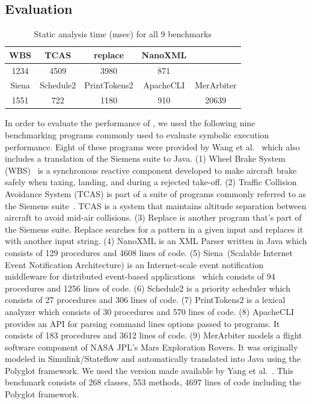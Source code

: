 \subsection{Evaluation}
\begin{table}[]
    \begin{tabular}{@{}ccccc@{}}
        \toprule
        WBS   & TCAS      & replace      & NanoXML   &            \\ \midrule
        1234  & 4509      & 3980         & 871       &            \\ \midrule
        Siena & Schedule2 & PrintTokens2 & ApacheCLI & MerArbiter \\ \midrule
        1551  & 722       & 1180         & 910       & 20639      \\ \bottomrule
    \end{tabular}
    \caption{Static analysis time (msec) for all 9 benchmarks}
    \label{table:static-analysis-time}
\end{table}
%
In order to evaluate the performance of \tool, we used the following nine benchmarking programs commonly used to
evaluate symbolic execution performance.
%
Eight of these programs were provided by Wang et al.~\cite{dgse} which also includes a translation of the
Siemens suite to Java.
%
(1) Wheel Brake System (WBS)~\cite{yang2014directed} is a synchronous reactive
component developed to make aircraft brake safely when taxing, landing, and during a rejected take-off.
%
(2) Traffic Collision Avoidance System (TCAS) is part of a suite of programs commonly referred to as the Siemens
suite~\cite{siemens-benchmarks}. TCAS is a system that maintains altitude separation between aircraft to avoid mid-air
collisions.
%
(3) Replace is another program that\rq s part of the Siemens suite. Replace searches for a pattern in a given input and
replaces it with another input string.
%
(4) NanoXML is an XML Parser written in Java which consists of 129 procedures and 4608 lines of code.
%
(5) Siena~(Scalable Internet Event Notification Architecture) is an Internet-scale event notification middleware for
distributed event-based applications~\cite{siena} which consists of 94 procedures and 1256 lines of code.
%
(6) Schedule2 is a priority scheduler which consists of 27 procedures and 306 lines of code.
%
(7) PrintTokens2 is a lexical analyzer which consists of 30 procedures and 570 lines of code.
%
(8) ApacheCLI~\cite{apachecli} provides an API for parsing command lines options passed to programs.
It consists of 183 procedures and 3612 lines of code.
%
(9) MerArbiter models a flight software component of NASA JPL\rq s Mars Exploration Rovers. It was originally modeled in
Simulink/Stateflow and automatically translated into Java using the Polyglot framework. We used the version made
available by Yang et al.~\cite{memoise}. This benchmark consists of 268 classes, 553 methods, 4697 lines of code
including the Polyglot framework.

